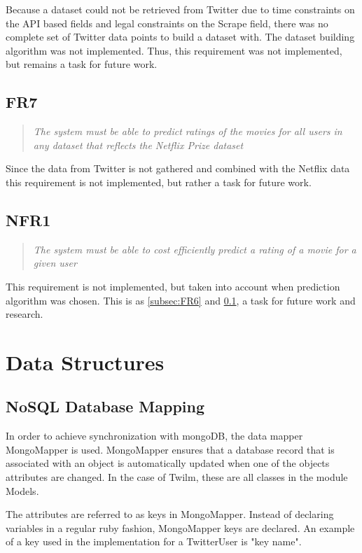 Because a dataset could not be retrieved from Twitter due to time constraints on the API based fields and legal constraints on the Scrape field, there was no complete set of Twitter data points to build a dataset with. The dataset building algorithm was not implemented. Thus, this requirement was not implemented, but remains a task for future work.

\subsection{FR7}\label{subsec:FR7}
\begin{quotation}
\em The system must be able to predict ratings of the movies for all users in any dataset that reflects the Netflix Prize dataset %
\end{quotation}

Since the data from Twitter is not gathered and combined with the Netflix data this requirement is not implemented, but rather a task for future work.

\subsection{NFR1}
\begin{quotation}
\em The system must be able to cost efficiently predict a rating of a movie for a given user %
\end{quotation}

This requirement is not implemented, but taken into account when prediction algorithm was chosen. This is as \ref{subsec:FR6} and \ref{subsec:FR7}, a task for future work and research.


\section{Data Structures}\label{impl:Data structures}
\subsection{NoSQL Database Mapping}
In order to achieve synchronization with mongoDB, the data mapper MongoMapper is used. MongoMapper ensures that a database record that is associated with an object is automatically updated when one of the objects attributes are changed. In the case of Twilm, these are all classes in the module Models.

The attributes are referred to as keys in MongoMapper. Instead of declaring variables in a regular ruby fashion, MongoMapper keys are declared. An example of a key used in the implementation for a TwitterUser is "key name".

